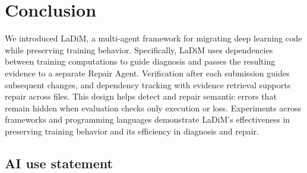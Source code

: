 \documentclass{article}
\begin{document}
\section{Conclusion}

We introduced LaDiM, a multi-agent framework for migrating deep learning code while preserving training behavior. Specifically, LaDiM uses dependencies between training computations to guide diagnosis and passes the resulting evidence to a separate Repair Agent. Verification after each submission guides subsequent changes, and dependency tracking with evidence retrieval supports repair across files. This design helps detect and repair semantic errors that remain hidden when evaluation checks only execution or loss. Experiments across frameworks and programming languages demonstrate LaDiM's effectiveness in preserving training behavior and its efficiency in diagnosis and repair.


\subsection*{AI use statement}




\end{document}

